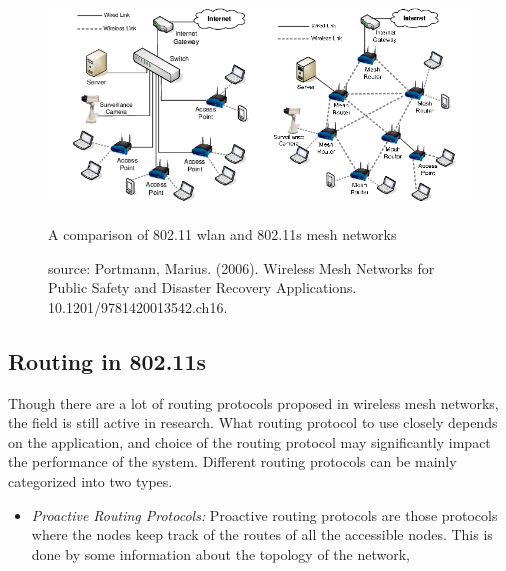 \begin{figure}
	\centering
	\includegraphics[scale=0.6]{Pictures/80211s.png}
	\caption{A comparison of 802.11 wlan and 802.11s mesh networks}
	\label{fig: 80211s}
	\caption*{source: Portmann, Marius. (2006). Wireless Mesh Networks for Public Safety and Disaster Recovery Applications. 10.1201/9781420013542.ch16. }
\end{figure}

\subsection{Routing in 802.11s}
Though there are a lot of routing protocols proposed in wireless mesh networks, the field is still active in research. What routing protocol to use closely depends on the application, and choice of the routing protocol may significantly impact the performance of the system. Different routing protocols can be mainly categorized into two types.
\begin{itemize}
	\item{\textit{Proactive Routing Protocols:} Proactive routing protocols are those protocols where the nodes keep track of the routes of all the accessible nodes. This is done by some information about the topology of the network, }
\end{itemize}










